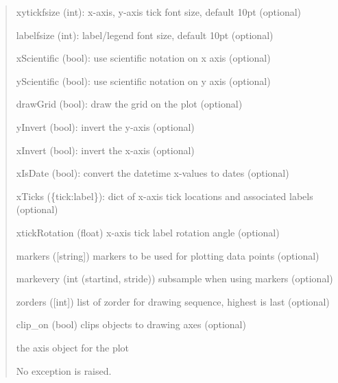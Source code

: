 \documentclass[a4paper,10pt,english]{sphinxmanual}
\begin{document}
\begin{fulllineitems}
\begin{fulllineitems}
\begin{quote}
\begin{description}
\begin{DUlineblock}{0em}
\item[] xytickfsize (int): x-axis, y-axis tick font size, default 10pt (optional)
\item[] labelfsize (int): label/legend font size, default 10pt (optional)
\item[] xScientific (bool): use scientific notation on x axis (optional)
\item[] yScientific (bool): use scientific notation on y axis (optional)
\item[] drawGrid (bool): draw the grid on the plot (optional)
\item[] yInvert (bool): invert the y-axis (optional)
\item[] xInvert (bool): invert the x-axis (optional)
\item[] xIsDate (bool): convert the datetime x-values to dates (optional)
\item[] xTicks (\{tick:label\}): dict of x-axis tick locations and associated labels (optional)
\item[] xtickRotation (float) x-axis tick label rotation angle (optional) 
\item[] markers ({[}string{]}) markers to be used for plotting data points (optional)
\item[] markevery (int \textbar{} (startind, stride)) subsample when using markers (optional)
\item[] zorders ({[}int{]}) list of zorder for drawing sequence, highest is last (optional)
\item[] clip\_on (bool) clips objects to drawing axes (optional)
\end{DUlineblock}

\item[{Returns:}] \leavevmode
\begin{DUlineblock}{0em}
\item[] the axis object for the plot
\end{DUlineblock}

\item[{Raises:}] \leavevmode
\begin{DUlineblock}{0em}
\item[] No exception is raised.
\end{DUlineblock}

\end{description}
\end{quote}

\end{fulllineitems}



\end{fulllineitems}
\end{document}
